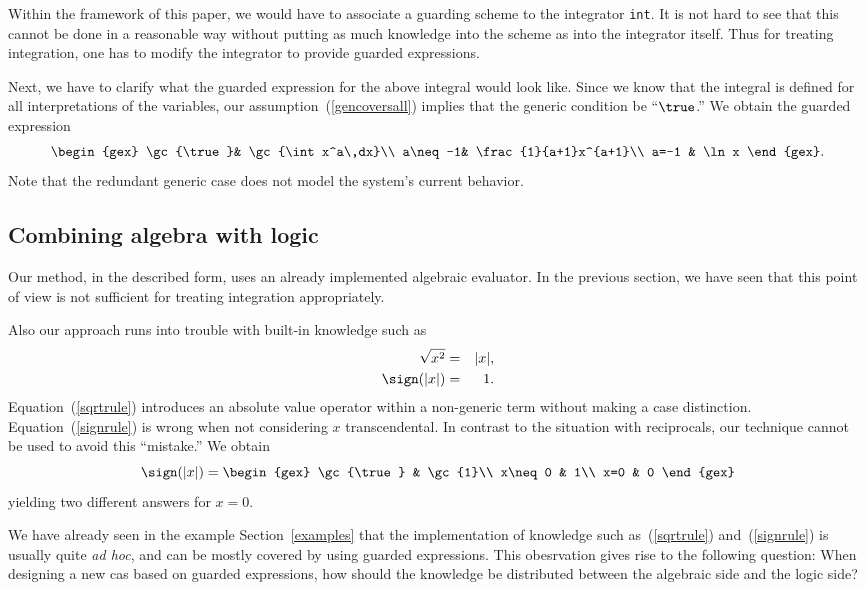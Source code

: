 Within the framework of this paper, we would have to associate a
guarding scheme to the integrator {\tt int}. It is not hard to see
that this cannot be done in a reasonable way without putting as much
knowledge into the scheme as into the integrator itself. Thus for
treating integration, one has to modify the integrator to provide
guarded expressions.

Next, we have to clarify what the guarded expression for the above
integral would look like. Since we know that the integral is defined
for all interpretations of the variables, our
assumption~(\ref{gencoversall}) implies that the generic condition be
``$\true$.'' We obtain the guarded expression
$$
\begin{gex}
\gc{\true}& \gc{\int x^a\,dx}\\
a\neq-1& \frac{1}{a+1}x^{a+1}\\
a=-1 & \ln x
\end{gex}.
$$
Note that the redundant generic case does not model the system's
current behavior.
%
\subsection{Combining algebra with logic}
Our method, in the described form, uses an already implemented
algebraic evaluator. In the previous section, we have seen that this
point of view is not sufficient for treating integration
appropriately.

Also our approach runs into trouble with built-in knowledge such as
\begin{eqnarray}
\sqrt{x^2}&=&|x|\label{sqrtrule},\\
\sign(|x|)&=&1\label{signrule}.
\end{eqnarray}
Equation~(\ref{sqrtrule}) introduces an absolute value operator within
a non-generic term without making a case distinction.
Equation~(\ref{signrule}) is wrong when not considering $x$
transcendental. In contrast to the situation with reciprocals, our
technique cannot be used to avoid this ``mistake.'' We obtain
$$
\sign(|x|)=\begin{gex}
\gc{\true} & \gc{1}\\
x\neq0 & 1\\
x=0 & 0
	   \end{gex}
$$
yielding two different answers for $x=0$.

We have already seen in the example Section~\ref{examples} that the
implementation of knowledge such as~(\ref{sqrtrule})
and~(\ref{signrule}) is usually quite {\it ad hoc}, and can be mostly
covered by using guarded expressions. This obesrvation gives rise to
the following question: When designing a new {\sc cas} based on guarded
expressions, how should the knowledge be distributed between the
algebraic side and the logic side?
%
